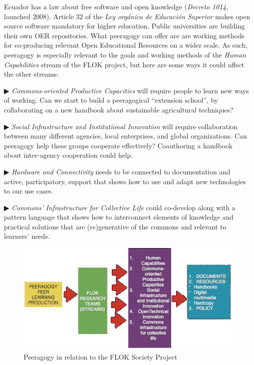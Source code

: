 Ecuador has a law about free software and open knowledge (\emph{Decreto 1014}, launched 2008). Article 32 of the \emph{Ley orgánica de Educación Superior} makes open source software mandatory for higher education. Public universities are building their own  OER repositories. What peeragogy can offer are are working methods for co-producing relevant Open Educational Resources on a wider scale.  As such, peeragogy is especially relevant to the goals and working methods of the \emph{Human Capabilities} stream of the FLOK project, but here are some ways it could affect the other streams:

▶ \emph{Commons-oriented Productive Capacities} will require people to learn new ways of working. Can we start to build a peeragogical “extension school”, by collaborating on a new handbook about sustainable agricultural techniques?

▶ \emph{Social Infrastructure and Institutional Innovation} will require collaboration between many different agencies, local enterprises, and global organizations. Can peeragogy help these groups cooperate effectively?  Coauthoring a handbook about inter-agency cooperation could help.

▶ \emph{Hardware and Connectivity} needs to be connected to documentation and active, participatory, support that shows how to use and adapt new technologies to our use cases. 

▶ \emph{Commons’ Infrastructure for Collective Life} could co-develop along with a pattern language that shows how to interconnect elements of knowledge and practical solutions that are (re)generative of the commons and relevant to learners' needs. 


\begin{figure}
\includegraphics[width=\textwidth]{../pictures/flok1.jpg}
\caption*{Peeragogy in relation to the FLOK Society Project}
\end{figure}

